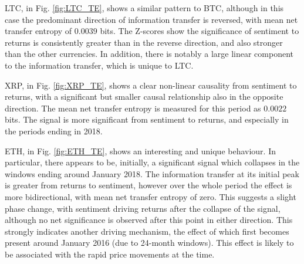 \documentclass[]{rsos}%
\begin{document}
  LTC, in Fig. \ref{fig:LTC_TE}, shows a similar pattern to BTC, although in this case the predominant direction of information transfer is reversed, with mean net transfer entropy of $0.0039$ bits. The Z-scores show the significance of sentiment to returns is consistently greater than in the reverse direction, and also stronger than the other currencies. In addition, there is notably a large linear component to the information transfer, which is unique to LTC. 

  XRP, in Fig. \ref{fig:XRP_TE}, shows a clear non-linear causality from sentiment to returns, with a significant but smaller causal relationship also in the opposite direction. The mean net transfer entropy is measured for this period as $0.0022$ bits. The signal is more significant from sentiment to returns, and especially in the periods ending in 2018. 
  
  ETH, in Fig. \ref{fig:ETH_TE}, shows an interesting and unique behaviour. In particular, there appears to be, initially, a significant signal which collapses in the windows ending around January 2018. The information transfer at its initial peak is greater from returns to sentiment, however over the whole period the effect is more bidirectional, with mean net transfer entropy of zero. This suggests a slight phase change, with sentiment driving returns after the collapse of the signal, although no net significance is observed after this point in either direction. This strongly indicates another driving mechanism, the effect of which first becomes present around January 2016 (due to 24-month windows). This effect is likely to be associated with the rapid price movements at the time.  %
  
\end{document}
